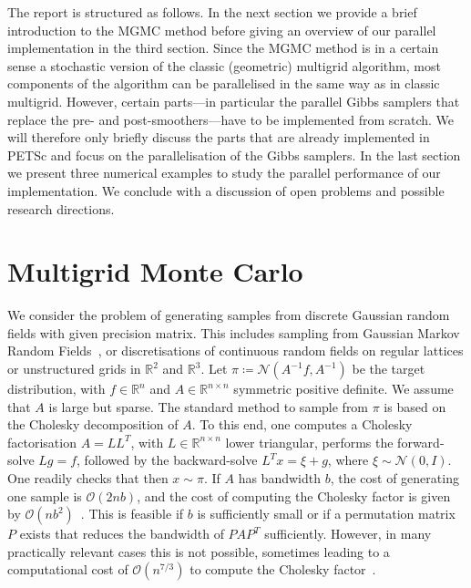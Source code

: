 \documentclass[
fontsize=11pt,
paper=a4,
numbers=noenddot
]{scrartcl}
\begin{document}
The report is structured as follows. In the next section we provide a brief introduction to the MGMC method before giving an overview of our parallel implementation in the third section. Since the MGMC method is in a certain sense a stochastic version of the classic (geometric) multigrid algorithm, most components of the algorithm can be parallelised in the same way as in classic multigrid. However, certain parts---in particular the parallel Gibbs samplers that replace the pre- and post-smoothers---have to be implemented from scratch. We will therefore only briefly discuss the parts that are already implemented in PETSc and focus on the  parallelisation of the Gibbs samplers. In the last section we present three numerical examples to study the parallel performance of our implementation. We conclude with a discussion of open problems and possible research directions.

\section{Multigrid Monte Carlo}
We consider the problem of generating samples from discrete Gaussian random fields with given precision matrix. This includes sampling from Gaussian Markov Random Fields~\cite{rue2005gaussian}, or discretisations of continuous random fields on regular lattices or unstructured grids in $\mathbb{R}^2$ and $\mathbb{R}^3$. Let $\pi\coloneqq\mathcal{N}(A^{-1}f, A^{-1})$ be the target distribution, with $f \in \mathbb{R}^n$ and $A \in \mathbb{R}^{n \times n}$ symmetric positive definite. We assume that $A$ is large but sparse. The standard method to sample from $\pi$ is based on the Cholesky decomposition of $A$. To this end, one computes a Cholesky factorisation $A = LL^T$, with $L \in \mathbb{R}^{n \times n}$ lower triangular, performs the forward-solve $L g = f$, followed by the backward-solve $L^T x = \xi + g$, where $\xi \sim \mathcal{N}(0,I)$. One readily checks that then $x \sim \pi$. If $A$ has bandwidth $b$, the cost of generating one sample is $\mathcal{O}(2nb)$, and the cost of computing the Cholesky factor is given by $\mathcal{O}(nb^2)$~\cite{golubvanloan}. This is feasible if $b$ is sufficiently small or if a permutation matrix $P$ exists that reduces the bandwidth of $PAP^T$ sufficiently. However, in many practically relevant cases this is not possible, sometimes leading to a computational cost of $\mathcal{O}(n^{7/3})$ to compute the Cholesky factor~\cite{foxparker}.
\end{document}
